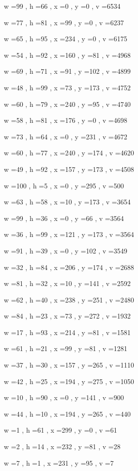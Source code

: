 \documentclass[11pt]{article}
\begin{document}
w =99 , h =66 , x =0 , y =0 , v =6534
\par
w =77 , h =81 , x =99 , y =0 , v =6237
\par
w =65 , h =95 , x =234 , y =0 , v =6175
\par
w =54 , h =92 , x =160 , y =81 , v =4968
\par
w =69 , h =71 , x =91 , y =102 , v =4899
\par
w =48 , h =99 , x =73 , y =173 , v =4752
\par
w =60 , h =79 , x =240 , y =95 , v =4740
\par
w =58 , h =81 , x =176 , y =0 , v =4698
\par
w =73 , h =64 , x =0 , y =231 , v =4672
\par
w =60 , h =77 , x =240 , y =174 , v =4620
\par
w =49 , h =92 , x =157 , y =173 , v =4508
\par
w =100 , h =5 , x =0 , y =295 , v =500
\par
w =63 , h =58 , x =10 , y =173 , v =3654
\par
w =99 , h =36 , x =0 , y =66 , v =3564
\par
w =36 , h =99 , x =121 , y =173 , v =3564
\par
w =91 , h =39 , x =0 , y =102 , v =3549
\par
w =32 , h =84 , x =206 , y =174 , v =2688
\par
w =81 , h =32 , x =10 , y =141 , v =2592
\par
w =62 , h =40 , x =238 , y =251 , v =2480
\par
w =84 , h =23 , x =73 , y =272 , v =1932
\par
w =17 , h =93 , x =214 , y =81 , v =1581
\par
w =61 , h =21 , x =99 , y =81 , v =1281
\par
w =37 , h =30 , x =157 , y =265 , v =1110
\par
w =42 , h =25 , x =194 , y =275 , v =1050
\par
w =10 , h =90 , x =0 , y =141 , v =900
\par
w =44 , h =10 , x =194 , y =265 , v =440
\par
w =1 , h =61 , x =299 , y =0 , v =61
\par
w =2 , h =14 , x =232 , y =81 , v =28
\par
w =7 , h =1 , x =231 , y =95 , v =7
\par
\newpage
\end{document}
